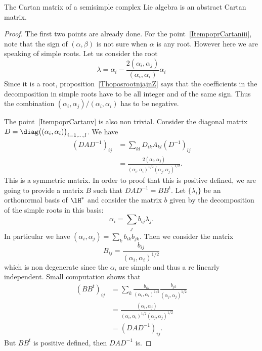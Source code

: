 \begin{proposition}
    The Cartan matrix of a semisimple complex Lie algebra is an abstract Cartan matrix.
\end{proposition}

\begin{proof}
    The first two points are already done. For the point~\ref{ItempoprCartaniii}, note that the sign of \( (\alpha,\beta)\) is not sure when \( \alpha\) is any root. However here we are speaking of simple roots. Let us consider the root
    \begin{equation}
        \lambda=\alpha_i-\frac{ 2(\alpha_i,\alpha_j) }{ (\alpha_i,\alpha_i) }\alpha_i
    \end{equation}
    Since it is a root, proposition~\ref{ThoposrootnjajnZ} says that the coefficients in the decomposition in simple roots have to be all integer and of the same sign. Thus the combination \( (\alpha_i,\alpha_j)/(\alpha_i,\alpha_i)\) has to be negative.

    The point~\ref{ItempoprCartanv} is also non trivial. Consider the diagonal matrix \( D=\diag\big( (\alpha_i,\alpha_i) \big)_{i=1,\ldots,l}\). We have
    \begin{subequations}
        \begin{align}
            (DAD^{-1})_{ij}&=\sum_{kl}D_{ik}A_{kl}(D^{-1})_{lj}\\
            &=\frac{ 2(\alpha_i,\alpha_j) }{ (\alpha_i,\alpha_i)^{1/2}(\alpha_j,\alpha_j)^{1/2} }.
        \end{align}
    \end{subequations}
    This is a symmetric matrix. In order to proof that this is positive defined, we are going to provide a matrix \( B\) such that \( DAD^{-1}=BB^t\). Let \( \{ \lambda_i \}\) be an orthonormal basis of \( \lH^*\) and consider the matrix \( b\) given by the decomposition of the simple roots in this basis:
    \begin{equation}
        \alpha_i=\sum_j b_{ij}\lambda_j.
    \end{equation}
    In particular we have \( (\alpha_i,\alpha_j)=\sum_kb_{ik}b_{jk}\). Then we consider the matrix
    \begin{equation}
        B_{ij}=\frac{ b_{ij} }{ (\alpha_i,\alpha_i)^{1/2} }
    \end{equation}
    which is non degenerate since the \( \alpha_i\) are simple and thus a re linearly independent. Small computation shows that
    \begin{subequations}
        \begin{align}
            (BB^t)_{ij}&=\sum_k\frac{ b_{ik} }{ (\alpha_i,\alpha_i)^{1/2} }\frac{ b_{jk} }{ (\alpha_j,\alpha_j)^{1/2} }\\
            &=\frac{ (\alpha_i,\alpha_j) }{ (\alpha_i,\alpha_i)^{1/2}(\alpha_j,\alpha_j)^{1/2} }\\
            &=(DAD^{-1})_{ij}.
        \end{align}
    \end{subequations}
    But \( BB^t\) is positive defined, then \( DAD^{-1}\) is.
\end{proof}


